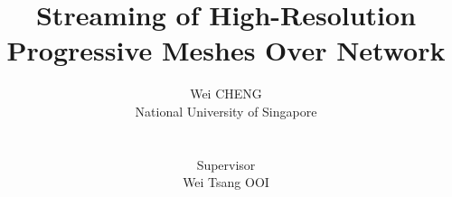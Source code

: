 \documentclass[11pt, a4paper]{report}
\title{Streaming of High-Resolution Progressive Meshes Over Network}
\author{Wei CHENG\\
National University of Singapore\\
\\
\\
Supervisor\\
Wei Tsang OOI}
\begin{document}
\maketitle
\doublespacing
\begin{abstract}

\end{abstract}
\end{document}
